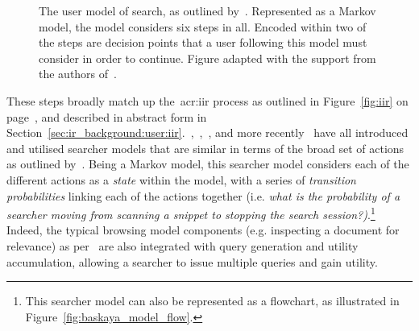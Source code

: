 \begin{figure}[t!]
    \centering
    \caption[Markov model of the search process by~\cite{baskaya2013behavioural_factors}]{The user model of search, as outlined by~\cite{baskaya2013behavioural_factors}. Represented as a Markov model, the model considers six steps in all. Encoded within two of the steps are decision points that a user following this model must consider in order to continue. Figure adapted with the support from the authors of~\citealt{baskaya2013behavioural_factors}.}
    \label{fig:baskaya_model}
\end{figure}

These steps broadly match up the~\gls{acr:iir} process as outlined in Figure~\ref{fig:iir} on page~\pageref{fig:iir}, and described in abstract form in Section~\ref{sec:ir_background:user:iir}.~\cite{azzopardi2011economics},~\cite{yilmaz2010browsing_utility},~\cite{carterette2011models}, and more recently~\cite{zhang2017simulation_model} have all introduced and utilised searcher models that are similar in terms of the broad set of actions as outlined by~\cite{baskaya2013behavioural_factors}. Being a Markov model, this searcher model considers each of the different actions as a \emph{state} within the model, with a series of \emph{transition probabilities} linking each of the actions together (i.e. \emph{what is the probability of a searcher moving from scanning a snippet to stopping the search session?)}.\footnote{This searcher model can also be represented as a flowchart, as illustrated in Figure~\ref{fig:baskaya_model_flow}.} Indeed, the typical browsing model components (e.g. inspecting a document for relevance) as per~\cite{carterette2011effectiveness_evaluation} are also integrated with query generation and utility accumulation, allowing a searcher to issue multiple queries and gain utility.

